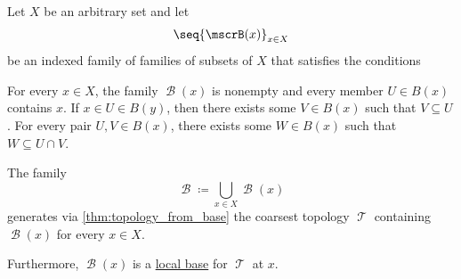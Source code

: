 \begin{proposition}\label{thm:topology_from_local_base}
  Let \( X \) be an arbitrary set and let
  \begin{equation*}
    \seq{ \mscrB(x) }_{x \in X}
  \end{equation*}
  be an indexed family of families of subsets of \( X \) that satisfies the conditions
  \begin{thmenum}
     For every \( x \in X \), the family \( \mscrB(x) \) is nonempty and every member \( U \in B(x) \) contains \( x \).
     If \( x \in U \in B(y) \), then there exists some \( V \in B(x) \) such that \( V \subseteq U \).
     For every pair \( U, V \in B(x) \), there exists some \( W \in B(x) \) such that \( W \subseteq U \cap V \).
  \end{thmenum}

  The family
  \begin{equation*}
    \mscrB \coloneqq \bigcup_{x \in X} \mscrB(x)
  \end{equation*}
  generates via \cref{thm:topology_from_base} the coarsest topology \( \mscrT \) containing \( \mscrB(x) \) for every \( x \in X \).

  Furthermore, \( \mscrB(x) \) is a \hyperref[def:topological_local_base]{local base} for \( \mscrT \) at \( x \).
\end{proposition}
